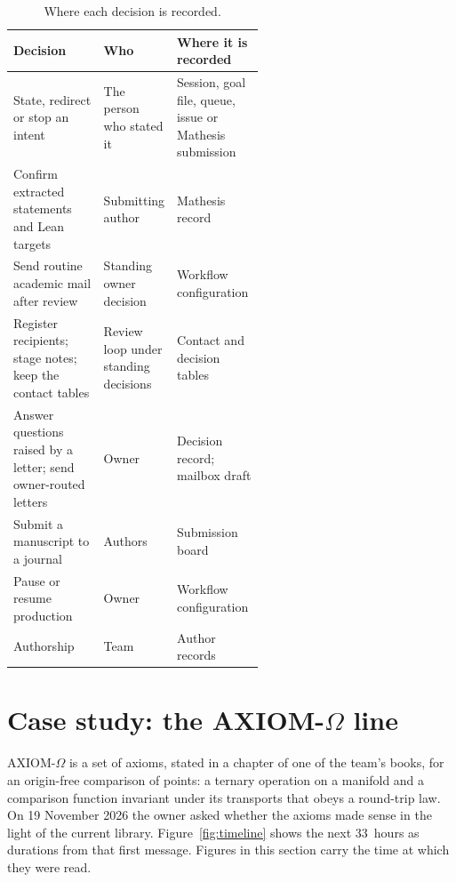 \documentclass[11pt]{article}
\begin{document}
\begin{table}[htbp]
\centering\small
\caption{Where each decision is recorded.}
\label{tab:human}
\begin{tabularx}{\linewidth}{@{}>{\raggedright\arraybackslash}p{0.36\linewidth}>{\raggedright\arraybackslash}p{0.2\linewidth}>{\raggedright\arraybackslash}X@{}}
\toprule
Decision & Who & Where it is recorded \\
\midrule
State, redirect or stop an intent & The person who stated it & Session, goal file, queue, issue or Mathesis submission \\
Confirm extracted statements and Lean targets & Submitting author & Mathesis record \\
Send routine academic mail after review & Standing owner decision & Workflow configuration \\
Register recipients; stage notes; keep the contact tables & Review loop under standing decisions & Contact and decision tables \\
Answer questions raised by a letter; send owner-routed letters & Owner & Decision record; mailbox draft \\
Submit a manuscript to a journal & Authors & Submission board \\
Pause or resume production & Owner & Workflow configuration \\
Authorship & Team & Author records \\
\bottomrule
\end{tabularx}
\end{table}

\section{Case study: the AXIOM-\texorpdfstring{$\Omega$}{Omega} line}
\label{sec:example}
AXIOM-$\Omega$ is a set of axioms, stated in a chapter of one of the team's
books, for an origin-free comparison of points: a ternary operation on a
manifold and a comparison function invariant under its transports that
obeys a round-trip law. On 19 November 2026 the owner asked whether the
axioms made sense in the light of the current library. Figure~\ref{fig:timeline}
shows the next 33~hours as durations from that first message. Figures in this
section carry the time at which they were read.
\end{document}
